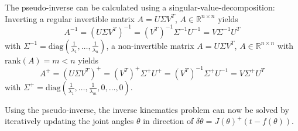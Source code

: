 The pseudo-inverse can be calculated using a singular-value-decomposition:
Inverting a regular invertible matrix \(A=U\Sigma V^T\), \(A\in\mathbb{R}^{n\times n}\) yields
\[A^{-1}=(U\Sigma V^T)^{-1}=(V^T)^{-1}\Sigma^{-1}U^{-1}=V\Sigma^{-1}U^T\]
with \(\Sigma^{-1}=\text{diag}(\frac{1}{\lambda_1},\dots,\frac{1}{\lambda_n})\),
 a non-invertible matrix \(A=U\Sigma V^T\), \(A\in\mathbb{R}^{n\times n}\) with \(\text{rank}(A)=m<n\) yields
\[A^+=(U\Sigma V^T)^+=(V^T)^+\Sigma^+U^+=(V^T)^{-1}\Sigma^+U^{-1}=V\Sigma^+U^T\]
with \(\Sigma^+=\text{diag}(\frac{1}{\lambda_1},\dots,\frac{1}{\lambda_m},0,\dots,0)\).

Using the pseudo-inverse, the inverse kinematics problem can now be solved by iteratively updating the joint angles \(\theta\) in direction of \(\delta\theta=J(\theta)^+(t-f(\theta))\).
